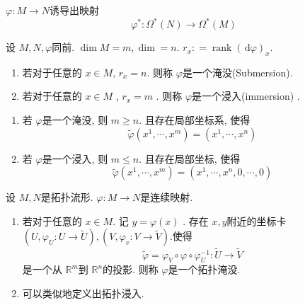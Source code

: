 \documentclass[../main.tex]{subfiles}
\begin{document}
\begin{definition}{}{}
    \(   \varphi:M\to N  \)诱导出映射 \[
     \varphi ^{*}:  \Omega^{*}\left( N \right)\to \Omega^{*}\left( M \right)  
    \] 
\end{definition}


\begin{definition}{}{}
    设 \(  M,N , \varphi  \)同前. \(  \operatorname{dim}M=m, \operatorname{dim}=n  \). \(  r_{x}: =\operatorname{rank}\left( \,\mathrm{d} \varphi \right)_{x}   \). 
    \begin{enumerate}
      \item 若对于任意的 \(  x \in M  \), \(  r_{x}=n  \). 则称 \(   \varphi  \)是一个淹没(Submersion). 
      \item 若对于任意的 \(  x \in M  \) , \(  r_{x} =m  \) . 则称 \(   \varphi  \)是一个浸入(immersion) .       
    \end{enumerate}
       
\end{definition}

\begin{proposition}{}{}
    \begin{enumerate}
      \item 若 \(   \varphi  \)是一个淹没, 则 \(  m\ge n  \). 且存在局部坐标系, 使得 \[
     \tilde{\varphi}\left(  x^1,\cdots,x^m \right)=\left(  x^1,\cdots,x^n \right)  
    \]
    \item 若 \(   \varphi  \)是一个浸入, 则 \(  m\le n  \). 且存在局部坐标, 使得 \[
     \tilde{\varphi}\left(  x^1,\cdots,x^m \right)=\left(  x^1,\cdots,x^n,0,\cdots,0 \right)  
    \]  
    \end{enumerate}
      
\end{proposition}


\begin{definition}{}{}
    设 \(  M,N  \)是拓扑流形. \(   \varphi:M\to N  \)是连续映射. 
    \begin{enumerate}
      \item 若对于任意的 \(  x \in M  \). 记 \(  y= \varphi\left( x \right)   \) . 存在 \(  x,y  \)附近的坐标卡 \(  \left( U, \varphi_{U}: U\to \tilde{U} \right), (V ,  \varphi_{v}:V\to \tilde{V})   \).使得\[
       \tilde{\varphi}= \varphi_{V}\circ  \varphi  \circ  \varphi_{U}^{-1}: \tilde{U}\to \tilde{V}
      \]是一个从 \(  \mathbb{R}^{m}  \)到 \(  \mathbb{R}^{n}  \)的投影. 则称 \(   \varphi  \)是一个拓扑淹没.         
      \item 可以类似地定义出拓扑浸入. 
    \end{enumerate}
      
\end{definition}
\end{document}
